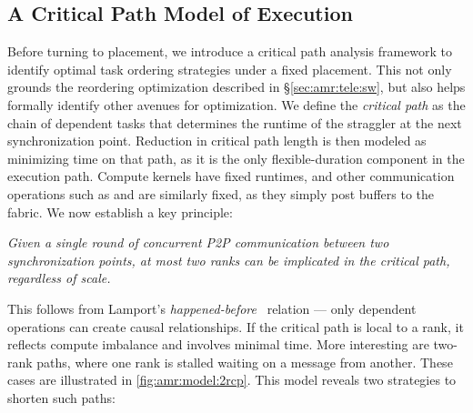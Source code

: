 \subsection{A Critical Path Model of Execution}\label{sec:amr:tele:critp}
\figAmrCritPath

Before turning to placement, we introduce a critical path analysis framework to identify optimal
task ordering strategies under a fixed placement.
This not only grounds the reordering optimization described in \S\ref{sec:amr:tele:sw}, but also helps
formally identify other avenues for optimization.
We define the \emph{critical path} as the chain of dependent tasks that determines the runtime of
the straggler at the next synchronization point.
Reduction in critical path length is then modeled as minimizing \mpiw{} time on that path, as it is
the only flexible-duration component in the execution path.
Compute kernels have fixed runtimes, and other communication operations such as \mpiis{} and
\mpiir{} are similarly fixed, as they simply post buffers to the fabric.
We now establish a key principle:

\vspace{2pt} \emph{Given a single round of
  concurrent P2P communication between two synchronization points, at most two ranks can be
  implicated in the critical path, regardless of scale.
}
\vspace{2pt}

\enlargethispage{-\baselineskip}

This follows from Lamport's \emph{happened-before}~\cite{Lampo1978:TimeClocksOrdering} relation ---
only dependent operations can create causal relationships.
If the critical path is local to a rank, it reflects compute imbalance and involves minimal \mpiw{}
time.
More interesting are two-rank paths, where one rank is stalled waiting on a message from another.
These cases are illustrated in \cref{fig:amr:model:2rcp}.
This model reveals two strategies to shorten such paths:

\figAmrSendOrder

